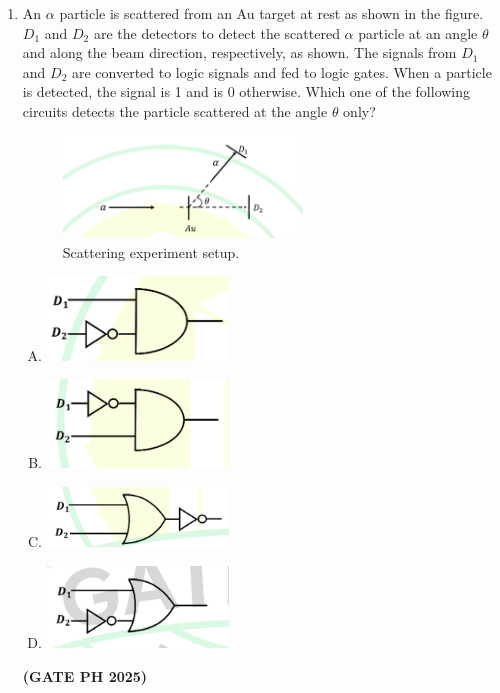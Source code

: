 \documentclass[14pt, a4paper]{extarticle}
\begin{document}
\begin{enumerate}[label=\textbf{Q.\arabic*}]
\item An $\alpha$ particle is scattered from an Au target at rest as shown in the figure. $D_1$ and $D_2$ are the detectors to detect the scattered $\alpha$ particle at an angle $\theta$ and along the beam direction, respectively, as shown. The signals from $D_1$ and $D_2$ are converted to logic signals and fed to logic gates. When a particle is detected, the signal is 1 and is 0 otherwise. Which one of the following circuits detects the particle scattered at the angle $\theta$ only?
\begin{figure}[H]
\centering
\includegraphics[width=0.6\textwidth]{figs/q41fig25.png}
\caption{Scattering experiment setup.}
\label{fig:q41_scattering}
\end{figure}
\begin{enumerate}[(A)]
\item \includegraphics[width=0.4\textwidth]{figs/q41figa25.png}
\item \includegraphics[width=0.4\textwidth]{figs/q41figb25.png}
\item \includegraphics[width=0.4\textwidth]{figs/q41figc25.png}
\item \includegraphics[width=0.4\textwidth]{figs/q41figd21.png}
\end{enumerate}
\hfill \textbf{(GATE PH 2025)}


\end{enumerate}
\end{document}
